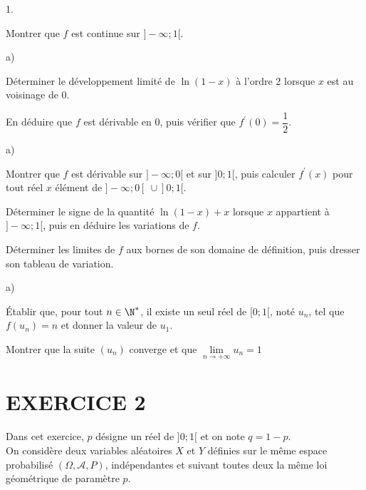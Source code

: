 \documentclass[11pt]{article}%
\begin{document}
\begin{noliste}{1.}
 \setlength{\itemsep}{4mm}
\item Montrer que $f$ est continue sur $]-\infty ;1[$.

\item 
\begin{noliste}{a)}
 \setlength{\itemsep}{2mm}
\item Déterminer le développement limité de $\ln(1-x)$ à
l'ordre 2 lorsque $x$ est au voisinage de 0.

\item En déduire que $f$ est dérivable en 0, puis vérifier que
$f^{\prime }(0) = \dfrac{1}{2}$.
\end{noliste}

\item 
\begin{noliste}{a)}
 \setlength{\itemsep}{2mm}
\item Montrer que $f$ est dérivable sur $]-\infty;0[$ et sur $]0;1[$,
puis calculer $f^{\prime }(x)$ pour tout réel $x$ élément de
$]-\infty;0[ \ \cup ]0;1[$.

\item Déterminer le signe de la quantité $\ln(1-x) + x$ lorsque $x$
appartient à $]-\infty;1[$, puis en déduire les variations de $f$.

\item Déterminer les limites de $f$ aux bornes de son domaine de
définition, puis dresser son tableau de variation.
\end{noliste}

\item 
\begin{noliste}{a)}
 \setlength{\itemsep}{2mm}
\item Établir que, pour tout $n\in \N^*$, il existe un seul réel
de $[0;1[$, noté $u_{n}$, tel que $f(u_{n}) = n$ et donner la valeur de
$u_{1}$.

\item Montrer que la suite $(u_{n})$ converge et que
$\underset{n\rightarrow
 + \infty }{\lim }u_{n} = 1$
\end{noliste}
\end{noliste}

\section*{EXERCICE 2}

Dans cet exercice, $p$ désigne un réel de $]0;1[$ et on note $q =
1-p$.\\
On considère deux variables aléatoires $X$ et $Y$ définies sur
le même espace probabilisé $(\Omega,\mathcal{A},P)$, indépendantes et
suivant toutes deux la même loi géométrique de paramètre $p$.
\end{document}
